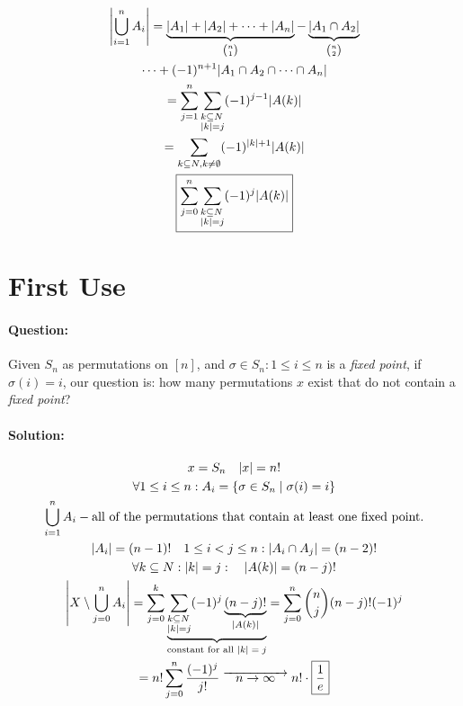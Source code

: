 \documentclass[00_complete]{subfiles}
\begin{document}
\begin{theorem}
    \begin{gather*}
        \left|\bigcup_{i=1}^nA_i\right| = \underbrace{|A_1|+|A_2|+\dots+|A_n|}_{\binom{n}{1}}
    - \underbrace{|A_1\cap A_2|}_{\binom{n}{2}} \\\dots +(-1)^{n+1}|A_1\cap A_2
    \cap \dots \cap A_n|\\
    =\sum_{j=1}^{n}\sum_{\begin{subarray}{l} k \subseteq N \\ |k| =
    j\end{subarray}} (-1)^{j-1}|A(k)| \\
    = \sum_{k \subseteq N, k \neq \emptyset} (-1)^{|k|+1}|A(k)| \\
    \boxed{\sum_{j=0}^n\sum_{\begin{subarray}{l}k \subseteq N \\ |k|= j\end{subarray}}
    (-1)^j|A(k)|}
    \end{gather*}
\end{theorem}

\section{First Use}

\paragraph{Question:}

Given $S_n$ as permutations on $[n]$, and $\sigma \in S_n: 1\leq i \leq n$ is a
\emph{fixed point}, if $\sigma(i)=i$, our question is: how many permutations
$x$ exist that do not contain a \emph{fixed point}?

\paragraph{Solution:}
\begin{gather*}
    x=S_n \quad |x|=n!\\
    \forall 1\leq i \leq n: A_i = \{\sigma \in S_n \mid \sigma(i)=i\}\\
    \bigcup_{i=1}^nA_i - \text{all of the permutations that contain at least one
    fixed point.}\\
    |A_i|=(n-1)! \quad 1 \leq i<j \leq n: |A_i \cap A_j|=(n-2)!\\
    \forall k \subseteq N: |k|=j: \quad |A(k)|=(n-j)!\\
    \left|X
    \setminus\bigcup_{j=0}^nA_i\right|=\sum_{j=0}^k\underbrace{\sum_{\begin{subarray}{1}k
    \subseteq
N\\|k|=j\end{subarray}}(-1)^j\underbrace{(n-j)!}_{|A(k)|}}_{\text{constant for
all $|k|=j$}} = \sum_{j=0}^{n}\binom{n}{j}(n-j)!(-1)^j \\
=n!\sum_{j=0}^n\frac{(-1)^j}{j!} \;\overrightarrow{\quad n \to \infty \quad}\;
n!\cdot\boxed{\frac{1}{e}}
\end{gather*}
\end{document}
